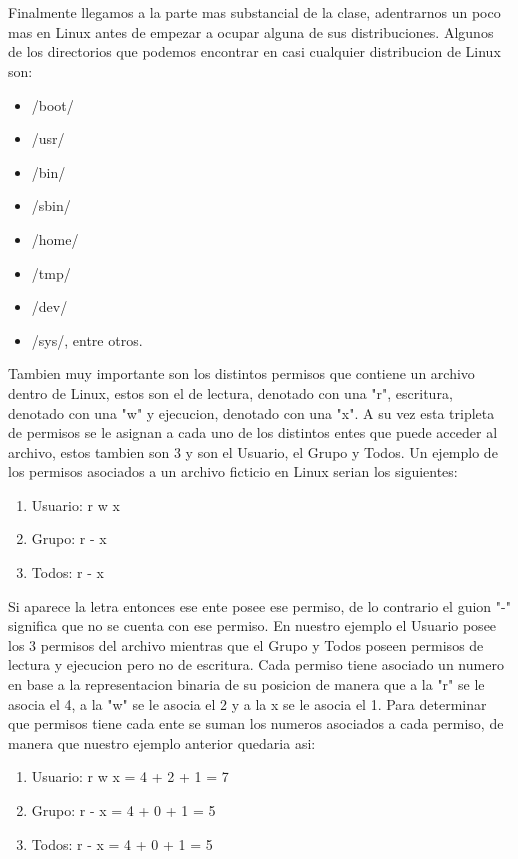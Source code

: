 \documentclass[letterpaper, 12pt, oneside]{article}
\begin{document}
	\\
	\\
	Finalmente llegamos a la parte mas substancial de la clase, adentrarnos un poco mas en Linux antes de empezar a ocupar alguna de sus distribuciones. Algunos de los directorios que podemos encontrar en casi cualquier distribucion de Linux son:
	\\
	\begin{itemize}
		\item /boot/
		\item /usr/
		\item /bin/
		\item /sbin/
		\item /home/
		\item /tmp/
		\item /dev/
		\item /sys/, entre otros.
	\\
	\end{itemize}
	Tambien muy importante son los distintos permisos que contiene un archivo dentro de Linux, estos son el de lectura, denotado con una "r", escritura, denotado con una "w" y ejecucion, denotado con una "x". A su vez esta tripleta de permisos se le asignan a cada uno de los distintos entes que puede acceder al archivo, estos tambien son 3 y son el Usuario, el Grupo y Todos. Un ejemplo de los permisos asociados a un archivo ficticio en Linux serian los siguientes:
	\\
	\begin{enumerate}
		\item Usuario: r w x
		\item Grupo: r - x
		\item Todos: r - x
	\\
	\end{enumerate}
	Si aparece la letra entonces ese ente posee ese permiso, de lo contrario el guion "-" significa que no se cuenta con ese permiso. En nuestro ejemplo el Usuario posee los 3 permisos del archivo mientras que el Grupo y Todos poseen permisos de lectura y ejecucion pero no de escritura. Cada permiso tiene asociado un numero en base a la representacion binaria de su posicion de manera que a la "r" se le asocia el 4, a la "w" se le asocia el 2 y a la x se le asocia el 1. Para determinar que permisos tiene cada ente se suman los numeros asociados a cada permiso, de manera que nuestro ejemplo anterior quedaria asi:
	\\
	\begin{enumerate}
		\item Usuario: r w x = 4 + 2 + 1 = 7
		\item Grupo: r - x = 4 + 0 + 1 = 5
		\item Todos: r - x = 4 + 0 + 1 = 5
	\\
	\end{enumerate}
\end{document}
